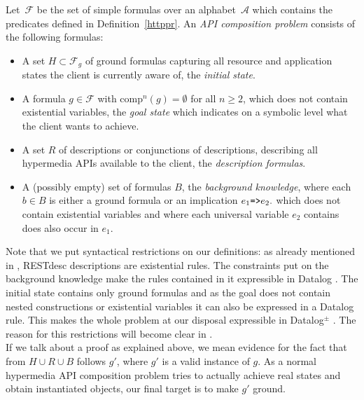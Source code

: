 \begin{definition}\label{apicomp}
Let~$\mathcal{F}$ be the set of simple \nthree formulas over an alphabet~$\mathcal{A}$ which contains the predicates defined in Definition~\ref{httppr}.
An \textit{API composition problem} consists of the following formulas:
\begin{itemize}
 \item A set $H\subset \mathcal{F}_g$ of ground formulas capturing all resource and application states the client is currently aware of,  the \textit{initial state}.
 \item 
 A formula $g\in \mathcal{F}$ with $\text{comp}^n(g)=\emptyset$ for all $n\geq 2$, which does not contain existential variables, the \textit{goal state} which
  indicates on a symbolic level what the client wants to achieve.
 \item A set $R$ of
 \restdesc descriptions or conjunctions of  \restdesc descriptions, describing
 all hypermedia APIs available to the client, the \textit{description formulas}.
 
 \item 
 A (possibly empty) set of \nthree formulas $B$, the \textit{background knowledge}, 
 where each $b\in B$ is either a ground formula or an implication $e_1\verb!=>! e_2.$ %
 which does not contain existential variables and 
 where each universal variable $e_2$ contains %
does also occur in $e_1$.%
\end{itemize}
\end{definition}

Note that we put syntactical restrictions on our definitions: as already mentioned in , RESTdesc descriptions are
existential rules. The constraints put on the background knowledge make the rules contained in it expressible in Datalog \cite{datalog}. The initial state
contains only ground formulas and as the goal does not contain nested constructions or existential variables it can also be expressed in a Datalog rule.
This makes the whole problem at our disposal expressible in Datalog$^\pm$ \cite{datalogpm}. The reason for this restrictions 
will become clear in . %
\\
If we talk about a proof as explained above, we mean evidence for the fact that
from $H\cup R \cup B$ follows $g'$, where $g'$ is a valid instance of $g$. 
As a normal hypermedia API composition problem tries to actually achieve real states
and obtain instantiated objects, our final target is to make $g'$ ground.

